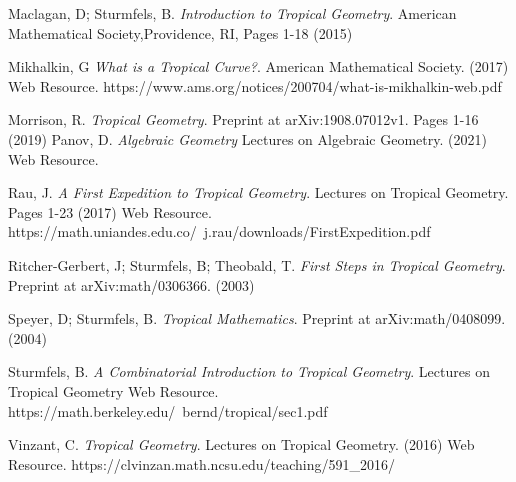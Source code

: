 \documentclass[]{article}
\theoremstyle{definition}
\numberwithin{equation}{section}
\renewcommand{\.}{\,.}
\begin{document}
\begin{thebibliography}{99}
	Maclagan, D; Sturmfels, B. \textit{Introduction to Tropical Geometry}. American Mathematical Society,Providence, RI, Pages 1-18 (2015)
	
	Mikhalkin, G \textit{What is a Tropical Curve?}. American Mathematical Society. (2017) Web Resource. https://www.ams.org/notices/200704/what-is-mikhalkin-web.pdf
	
	Morrison, R. \textit{Tropical Geometry}. Preprint at arXiv:1908.07012v1. Pages 1-16 (2019)
	Panov, D. \textit{Algebraic Geometry} Lectures on Algebraic Geometry. (2021) Web Resource. 
	
	Rau, J. \textit{A First Expedition to Tropical Geometry}. Lectures on Tropical  Geometry. Pages 1-23 (2017) Web Resource. https://math.uniandes.edu.co/~j.rau/downloads/FirstExpedition.pdf
	
	Ritcher-Gerbert, J; Sturmfels, B; Theobald, T. \textit{First Steps in Tropical Geometry}. Preprint at arXiv:math/0306366. (2003) 
	
	Speyer, D; Sturmfels, B. \textit{Tropical Mathematics}. Preprint at arXiv:math/0408099. (2004) 	
	
	Sturmfels, B. \textit{A Combinatorial Introduction to Tropical Geometry}. Lectures on Tropical Geometry Web Resource. https://math.berkeley.edu/~bernd/tropical/sec1.pdf

Vinzant, C. \textit{Tropical Geometry}. Lectures on Tropical Geometry. (2016) Web Resource. https://clvinzan.math.ncsu.edu/teaching/591\_2016/
	

\end{thebibliography}
\end{document}
